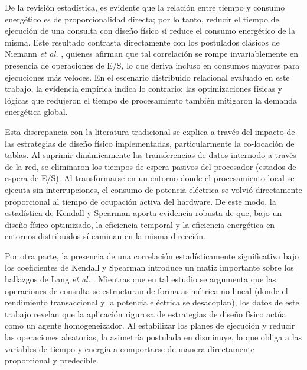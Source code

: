 \documentclass[12pt, letter paper]{report}
\begin{document}
      De la revisión estadística, es evidente que la relación entre tiempo y
      consumo energético es de proporcionalidad directa; por lo tanto, reducir
      el tiempo de ejecución de una consulta con diseño físico sí reduce el
      consumo energético de la misma. Este resultado contrasta directamente con
      los postulados clásicos de Niemann \textit{et al.} \cite{niemanndoes2013},
      quienes afirman que tal correlación se rompe invariablemente en presencia
      de operaciones de E/S, lo que deriva incluso en consumos mayores para
      ejecuciones más veloces. En el escenario distribuido relacional evaluado
      en este trabajo, la evidencia empírica indica lo contrario: las
      optimizaciones físicas y lógicas que redujeron el tiempo de procesamiento
      también mitigaron la demanda energética global.

      Esta discrepancia con la literatura tradicional se explica a través del
      impacto de las estrategias de diseño físico implementadas, particularmente
      la co-locación de tablas. Al suprimir dinámicamente las transferencias de
      datos internodo a través de la red, se eliminaron los tiempos de espera
      pasivos del procesador (estados de espera de E/S). Al transformarse en un
      entorno donde el procesamiento local se ejecuta sin interrupciones, el
      consumo de potencia eléctrica se volvió directamente proporcional al
      tiempo de ocupación activa del hardware. De este modo, la estadística de
      Kendall y Spearman aporta evidencia robusta de que, bajo un diseño físico
      optimizado, la eficiencia temporal y la eficiencia energética en entornos
      distribuidos sí caminan en la misma dirección.

      Por otra parte, la presencia de una correlación estadísticamente
      significativa bajo los coeficientes de Kendall y Spearman introduce un
      matiz importante sobre los hallazgos de Lang \textit{et al.}
      \cite{langtowards2012}. Mientras que en tal estudio se argumenta que las
      operaciones de consulta se estructuran de forma asimétrica no lineal
      (donde el rendimiento transaccional y la potencia eléctrica se
      desacoplan), los datos de este trabajo revelan que la aplicación rigurosa
      de estrategias de diseño físico actúa como un agente homogeneizador. Al
      estabilizar los planes de ejecución y reducir las operaciones aleatorias,
      la asimetría postulada en \cite{langtowards2012} disminuye, lo que obliga
      a las variables de tiempo y energía a comportarse de manera directamente
      proporcional y predecible.
\end{document}
